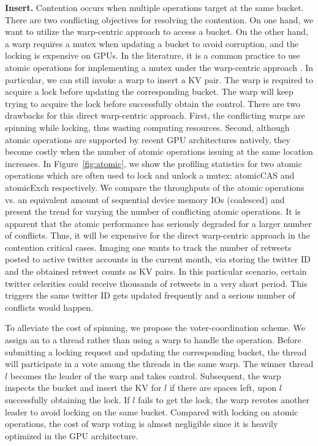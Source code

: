 \vspace{1mm}\noindent\textbf{Insert.} Contention occurs when multiple  operations target at the same bucket. 
There are two conflicting objectives for resolving the contention. On one hand, we want to utilize the warp-centric approach to access a bucket.
On the other hand, a warp requires a mutex when updating a bucket to avoid corruption, and the locking is expensive on GPUs.  
In the literature, it is a common practice to use atomic operations for implementing a mutex under the warp-centric approach \cite{zhang2015mega}. 
In particular, we can still invoke a warp to insert a KV pair. The warp is required to acquire a lock before updating the corresponding bucket. 
The warp will keep trying to acquire the lock before successfully obtain the control. 
There are two drawbacks for this direct warp-centric approach. 
First, the conflicting warps are spinning while locking, thus wasting computing resources.
Second, although atomic operations are supported by recent GPU architectures natively, 
they become costly when the number of atomic operations issuing at the same location increases. 
In Figure~\ref{fig:atomic}, we show the profiling statistics for two atomic operations which are often used to lock and unlock a mutex: atomicCAS and atomicExch respectively. 
We compare the throughputs of the atomic operations vs. an equivalent amount of sequential device memory IOs (coalesced) and present the trend for varying the number of conflicting atomic operations. It is apparent that the atomic performance has seriously degraded for a larger number of conflicts. 
Thus, it will be expensive for the direct warp-centric approach in the contention critical cases. 
Imaging one wants to track the number of retweets posted to active twitter accounts in the current month, via storing the twitter ID and the obtained retweet counts as KV pairs. In this particular scenario, certain twitter celerities could receive thousands of retweets in a very short period. 
This triggers the same twitter ID gets updated frequently and a serious number of conflicts would happen. 

To alleviate the cost of spinning, we propose the voter-coordination scheme. 
We assign an  to a thread rather than using a warp to handle the operation. Before submitting a locking request and updating the corresponding bucket, the thread will participate in a vote among the threads in the same warp. 
The winner thread $l$ becomes the leader of the warp and takes control. Subsequent, the warp inspects the bucket and insert the KV for $l$ if there are spaces left, upon $l$ successfully obtaining the lock.
If $l$ fails to get the lock, the warp revotes another leader to avoid locking on the same bucket.
Compared with locking on atomic operations, the cost of warp voting is almost negligible since it is heavily optimized in the GPU architecture.  


